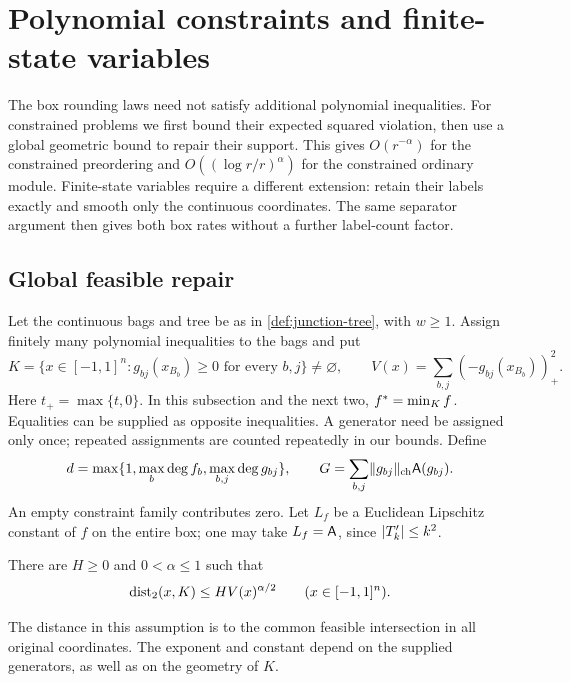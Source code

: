 \section{Polynomial constraints and finite-state variables}\label{sec:extensions}

The box rounding laws need not satisfy additional polynomial inequalities.
For constrained problems we first bound their expected squared violation,
then use a global geometric bound to repair their support. This gives
$O(r^{-\alpha})$ for the constrained preordering and
$O((\log r/r)^\alpha)$ for the constrained ordinary module. Finite-state
variables require a different extension: retain their labels exactly and
smooth only the continuous coordinates. The same separator argument then
gives both box rates without a further label-count factor.

\subsection{Global feasible repair}\label{sec:ext-geometry}

Let the continuous bags and tree be as in \cref{def:junction-tree}, with
$w\ge1$. Assign finitely many polynomial inequalities to the bags and put
\begin{equation}\label{eq:ext-K}
 K=\{x\in[-1,1]^n:g_{bj}(x_{B_b})\ge0\text{ for every }b,j\}\ne\varnothing,
 \qquad V(x)=\sum_{b,j}(-g_{bj}(x_{B_b}))_+^2.
\end{equation}
Here $t_+=\max\{t,0\}$. In this subsection and the next two,
$f^{*}=\min_K f$. Equalities can be supplied as opposite inequalities.
A generator need be assigned only once; repeated assignments are counted
repeatedly in our bounds. Define
\[
 d=\max\{1,\max_b\deg f_b,\max_{b,j}\deg g_{bj}\},\qquad
 G=\sum_{b,j}\lVert g_{bj}\rVert_{\mathrm{ch}}\mathsf{A}(g_{bj}).
\]
An empty constraint family contributes zero. Let $L_f$ be a Euclidean
Lipschitz constant of $f$ on the entire box; one may take $L_f=\mathsf{A}$,
since $\lvert T_k'\rvert\le k^2$.

\begin{assumption}\label{ass:global-error}
There are $H\ge0$ and $0<\alpha\le1$ such that
\begin{equation}\label{eq:ext-error-bound}
 \operatorname{dist}_2(x,K)\le H V(x)^{\alpha/2}\qquad(x\in[-1,1]^n).
\end{equation}
\end{assumption}

The distance in this assumption is to the common feasible intersection in
all original coordinates. The exponent and constant depend on the supplied
generators, as well as on the geometry of $K$.

